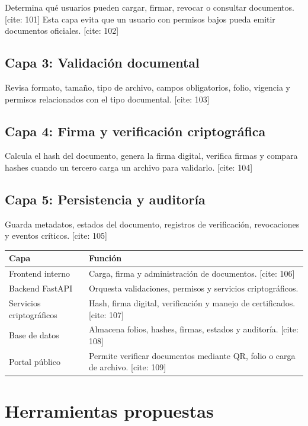 \documentclass[10pt]{article} [cite: 1]
\begin{document}
Determina qué usuarios pueden cargar, firmar, revocar o consultar documentos. [cite: 101] Esta capa evita que un usuario con permisos bajos pueda emitir documentos oficiales. [cite: 102]

\subsection{Capa 3: Validación documental}

Revisa formato, tamaño, tipo de archivo, campos obligatorios, folio, vigencia y permisos relacionados con el tipo documental. [cite: 103]

\subsection{Capa 4: Firma y verificación criptográfica}

Calcula el hash del documento, genera la firma digital, verifica firmas y compara hashes cuando un tercero carga un archivo para validarlo. [cite: 104]

\subsection{Capa 5: Persistencia y auditoría}

Guarda metadatos, estados del documento, registros de verificación, revocaciones y eventos críticos. [cite: 105]

\begin{center}
\begin{tabular}{|p{4cm}|p{9cm}|}
\hline
\textbf{Capa} & \textbf{Función} \\
\hline
Frontend interno & Carga, firma y administración de documentos. [cite: 106] \\
\hline
Backend FastAPI & Orquesta validaciones, permisos y servicios criptográficos. \\
\hline
Servicios criptográficos & Hash, firma digital, verificación y manejo de certificados. [cite: 107] \\
\hline
Base de datos & Almacena folios, hashes, firmas, estados y auditoría. [cite: 108] \\
\hline
Portal público & Permite verificar documentos mediante QR, folio o carga de archivo. [cite: 109] \\
\hline
\end{tabular}
\end{center}

\section{Herramientas propuestas}
\end{document}
